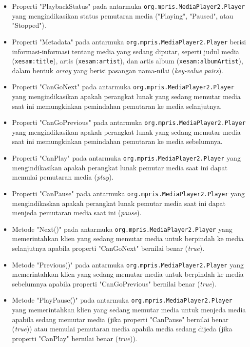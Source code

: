 \begin{itemize}
    \item Properti "PlaybackStatus" pada antarmuka \verb|org.mpris.MediaPlayer2.Player| yang mengindikasikan status pemutaran media ("Playing", "Paused", atau "Stopped").

    \item Properti "Metadata" pada antarmuka \verb|org.mpris.MediaPlayer2.Player| berisi informasi-informasi tentang media yang sedang diputar, seperti judul media (\verb|xesam:title|), artis (\verb|xesam:artist|), dan artis album (\verb|xesam:albumArtist|), dalam bentuk \textit{array} yang berisi pasangan nama-nilai (\textit{key-value pairs}).
    
    \item Properti "CanGoNext" pada antarmuka \verb|org.mpris.MediaPlayer2.Player| yang mengindikasikan apakah perangkat lunak yang sedang memutar media saat ini memungkinkan pemindahan pemutaran ke media selanjutnya.
    
    \item Properti "CanGoPrevious" pada antarmuka \verb|org.mpris.MediaPlayer2.Player| yang mengindikasikan apakah perangkat lunak yang sedang memutar media saat ini memungkinkan pemindahan pemutaran ke media sebelumnya.
    
    \item Properti "CanPlay" pada antarmuka \verb|org.mpris.MediaPlayer2.Player| yang mengindikasikan apakah perangkat lunak pemutar media saat ini dapat memulai pemutaran media (\textit{play}).
    
    \item Properti "CanPause" pada antarmuka \verb|org.mpris.MediaPlayer2.Player| yang mengindikaskan apakah perangkat lunak pemutar media saat ini dapat menjeda pemutaran media saat ini (\textit{pause}).
    
    \item Metode "Next()" pada antarmuka \verb|org.mpris.MediaPlayer2.Player| yang memerintahkan klien yang sedang memutar media untuk berpindah ke media selanjutnya apabila properti "CanGoNext" bernilai benar (\textit{true}).
    
    \item Metode "Previous()" pada antarmuka \verb|org.mpris.MediaPlayer2.Player| yang memerintahkan klien yang sedang memutar media untuk berpindah ke media sebelumnya apabila properti "CanGoPrevious" bernilai benar (\textit{true}).
    
    \item Metode "PlayPause()" pada antarmuka \verb|org.mpris.MediaPlayer2.Player| yang memerintahkan klien yang sedang memutar media untuk menjeda media apabila sedang memutar media (jika properti "CanPause" bernilai benar (\textit{true})) atau memulai pemutaran media apabila media sedang dijeda (jika properti "CanPlay" bernilai benar (\textit{true})).
    

\end{itemize}
